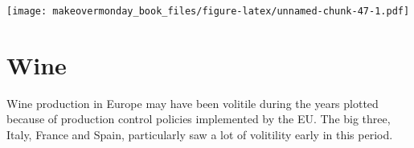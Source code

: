 \documentclass[]{book}
\newenvironment{Shaded}{\begin{snugshade}}{\end{snugshade}}
\newcommand{\KeywordTok}[1]{\textcolor[rgb]{0.13,0.29,0.53}{\textbf{#1}}}
\newcommand{\StringTok}[1]{\textcolor[rgb]{0.31,0.60,0.02}{#1}}
\newcommand{\OperatorTok}[1]{\textcolor[rgb]{0.81,0.36,0.00}{\textbf{#1}}}
\newcommand{\NormalTok}[1]{#1}
\theoremstyle{definition}
\theoremstyle{definition}
\theoremstyle{definition}
\theoremstyle{remark}
\begin{document}
\texttt{[image: makeovermonday\_book\_files/figure-latex/unnamed-chunk-47-1.pdf]}

\chapter{Wine}\label{wine}

Wine production in Europe may have been volitile during the years
plotted because of production control policies implemented by the EU.
The big three, Italy, France and Spain, particularly saw a lot of
volitility early in this period.

\begin{Shaded}
\end{Shaded}
\end{document}
